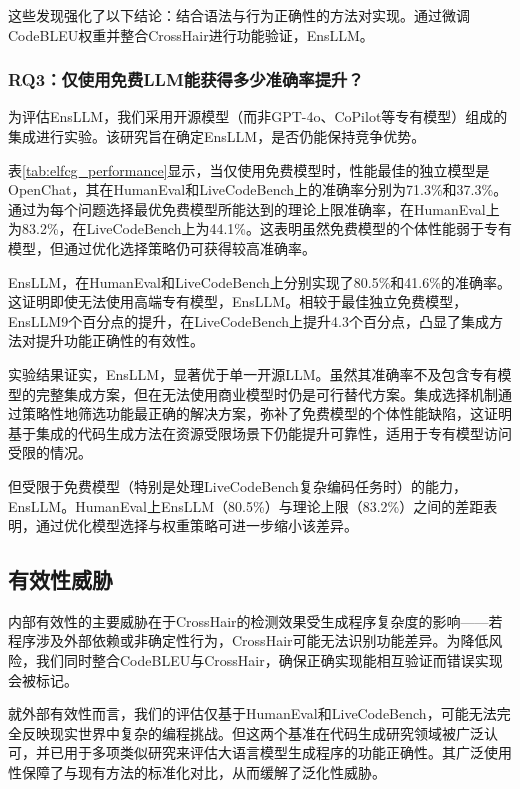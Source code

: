 \documentclass{article}
\newcommand{\tool}{EnsLLM}
\begin{document}
\begin{CJK*}{UTF8}{gbsn}
这些发现强化了以下结论：结合语法与行为正确性的方法对实现。通过微调CodeBLEU权重并整合CrossHair进行功能验证，\tool{}。
\subsubsection{RQ3：仅使用免费LLM能获得多少准确率提升？}

\leavevmode\par
为评估\tool{}，我们采用开源模型（而非GPT-4o、CoPilot等专有模型）组成的集成进行实验。该研究旨在确定\tool{}，是否仍能保持竞争优势。

表\ref{tab:elfcg_performance}显示，当仅使用免费模型时，性能最佳的独立模型是OpenChat，其在HumanEval和LiveCodeBench上的准确率分别为71.3\%和37.3\%。通过为每个问题选择最优免费模型所能达到的理论上限准确率，在HumanEval上为83.2\%，在LiveCodeBench上为44.1\%。这表明虽然免费模型的个体性能弱于专有模型，但通过优化选择策略仍可获得较高准确率。

\tool{}，在HumanEval和LiveCodeBench上分别实现了80.5\%和41.6\%的准确率。这证明即使无法使用高端专有模型，\tool{}。相较于最佳独立免费模型，\tool{}9个百分点的提升，在LiveCodeBench上提升4.3个百分点，凸显了集成方法对提升功能正确性的有效性。

实验结果证实，\tool{}，显著优于单一开源LLM。虽然其准确率不及包含专有模型的完整集成方案，但在无法使用商业模型时仍是可行替代方案。集成选择机制通过策略性地筛选功能最正确的解决方案，弥补了免费模型的个体性能缺陷，这证明基于集成的代码生成方法在资源受限场景下仍能提升可靠性，适用于专有模型访问受限的情况。

但受限于免费模型（特别是处理LiveCodeBench复杂编码任务时）的能力，\tool{}。HumanEval上\tool{}（80.5\%）与理论上限（83.2\%）之间的差距表明，通过优化模型选择与权重策略可进一步缩小该差异。
\subsection{有效性威胁}
内部有效性的主要威胁在于CrossHair的检测效果受生成程序复杂度的影响——若程序涉及外部依赖或非确定性行为，CrossHair可能无法识别功能差异。为降低风险，我们同时整合CodeBLEU与CrossHair，确保正确实现能相互验证而错误实现会被标记。

就外部有效性而言，我们的评估仅基于HumanEval和LiveCodeBench，可能无法完全反映现实世界中复杂的编程挑战。但这两个基准在代码生成研究领域被广泛认可，并已用于多项类似研究来评估大语言模型生成程序的功能正确性。其广泛使用性保障了与现有方法的标准化对比，从而缓解了泛化性威胁。


\end{CJK*}
\end{document}
